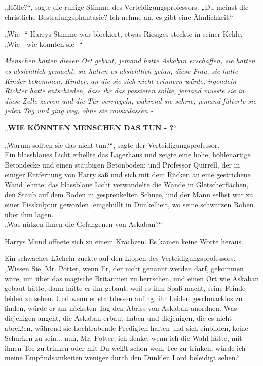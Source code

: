 {„Hölle?“, sagte die ruhige Stimme des Verteidigungsprofessors. „Du meinst die christliche Bestrafungsphantasie? Ich nehme an, es gibt eine Ähnlichkeit.“

„Wie -“ Harrys Stimme war blockiert, etwas Riesiges steckte in seiner Kehle. „Wie - wie konnten sie -“

\emph{Menschen hatten diesen Ort gebaut, jemand hatte Askaban erschaffen, sie hatten es absichtlich gemacht, sie hatten es absichtlich getan, diese Frau, sie hatte Kinder bekommen, Kinder, an die sie sich nicht erinnern würde, irgendein Richter hatte} \emph{entschieden, dass ihr das passieren sollte, jemand musste sie in diese Zelle zerren und die Tür verriegeln, während sie schrie, jemand fütterte sie} \emph{jeden Tag und ging weg, ohne sie rauszulassen -}

„\textbf{WIE KÖNNTEN MENSCHEN DAS TUN - ?}“

„Warum sollten sie das nicht tun?“, sagte der Verteidigungsprofessor.\\ Ein blassblaues Licht erhellte das Lagerhaus und zeigte eine hohe, höhlenartige Betondecke und einen staubigen Betonboden; und Professor Quirrell, der in einiger Entfernung von Harry saß und sich mit dem Rücken an eine gestrichene Wand lehnte; das blassblaue Licht verwandelte die Wände in Gletscherflächen, den Staub auf dem Boden in gesprenkelten Schnee, und der Mann selbst war zu einer Eisskulptur geworden, eingehüllt in Dunkelheit, wo seine schwarzen Roben über ihm lagen.\\ „Was nützen ihnen die Gefangenen von Askaban?“

Harrys Mund öffnete sich zu einem Krächzen. Es kamen keine Worte heraus.

Ein schwaches Lächeln zuckte auf den Lippen des Verteidigungsprofessors.\\ „Wissen Sie, Mr. Potter, wenn Er, der nicht genannt werden darf, gekommen wäre, um über das magische Britannien zu herrschen, und einen Ort wie Askaban gebaut hätte, dann hätte er ihn gebaut, weil es ihm Spaß macht, seine Feinde leiden zu sehen. Und wenn er stattdessen anfing, ihr Leiden geschmacklos zu finden, würde er am nächsten Tag den Abriss von Askaban anordnen. Was diejenigen angeht, die Askaban erbaut haben und diejenigen, die es nicht abreißen, während sie hochtrabende Predigten halten und sich einbilden, keine Schurken zu sein... nun, Mr. Potter, ich denke, wenn ich die Wahl hätte, mit ihnen Tee zu trinken oder mit Du-weißt-schon-wem Tee zu trinken, würde ich meine Empfindsamkeiten weniger durch den Dunklen Lord beleidigt sehen.“

}

